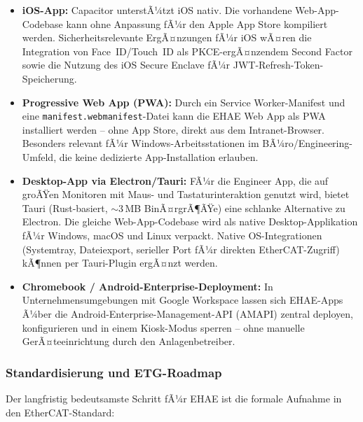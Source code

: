 ﻿\documentclass[12pt,a4paper]{article}
\begin{document}
\begin{itemize}[leftmargin=2em]
  \item \textbf{iOS-App:} Capacitor unterstÃ¼tzt iOS nativ. Die vorhandene
    Web-App-Codebase kann ohne Anpassung fÃ¼r den Apple App Store kompiliert
    werden. Sicherheitsrelevante ErgÃ¤nzungen fÃ¼r iOS wÃ¤ren die Integration von
    Face~ID/Touch~ID als PKCE-ergÃ¤nzendem Second Factor sowie die Nutzung
    des iOS Secure Enclave fÃ¼r JWT-Refresh-Token-Speicherung.
  \item \textbf{Progressive Web App (PWA):} Durch ein Service Worker-Manifest
    und eine \texttt{manifest.webmanifest}-Datei kann die EHAE Web App als
    PWA installiert werden -- ohne App Store, direkt aus dem Intranet-Browser.
    Besonders relevant fÃ¼r Windows-Arbeitsstationen im BÃ¼ro/Engineering-Umfeld,
    die keine dedizierte App-Installation erlauben.
  \item \textbf{Desktop-App via Electron/Tauri:} FÃ¼r die Engineer App, die
    auf groÃŸen Monitoren mit Maus- und Tastaturinteraktion genutzt wird, bietet
    Tauri (Rust-basiert, $\sim$3\,MB BinÃ¤rgrÃ¶ÃŸe) eine schlanke Alternative zu
    Electron. Die gleiche Web-App-Codebase wird als native Desktop-Applikation
    fÃ¼r Windows, macOS und Linux verpackt. Native OS-Integrationen (Systemtray,
    Dateiexport, serieller Port fÃ¼r direkten EtherCAT-Zugriff) kÃ¶nnen per
    Tauri-Plugin ergÃ¤nzt werden.
  \item \textbf{Chromebook / Android-Enterprise-Deployment:} In
    Unternehmensumgebungen mit Google Workspace lassen sich EHAE-Apps
    Ã¼ber die Android-Enterprise-Management-API (AMAPI) zentral deployen,
    konfigurieren und in einem Kiosk-Modus sperren -- ohne manuelle
    GerÃ¤teeinrichtung durch den Anlagenbetreiber.
\end{itemize}

\subsubsection*{Standardisierung und ETG-Roadmap}

Der langfristig bedeutsamste Schritt fÃ¼r EHAE ist die formale Aufnahme in den
EtherCAT-Standard:
\end{document}
